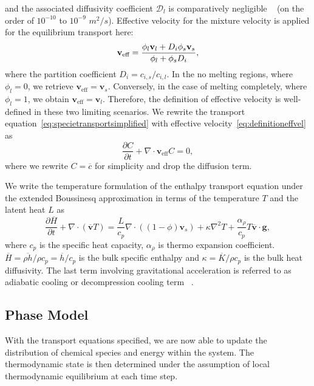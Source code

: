 and the associated diffusivity coefficient $\mathcal{D}_l$
is comparatively negligible ~\cite{GeochemicalConsequence} (on the order of $10^{-10}$ to $10^{-9}$ $m^2/s$). 
Effective velocity for the mixture velocity is applied for the equilibrium transport here:
\begin{equation}\label{eq:definitioneffvel}
\bold{v}_{\text{eff}} = \frac{\phi_l \bold{v}_l + D_i\phi_s \bold{v}_s}{\phi_l + \phi_s D_i},
\end{equation}
where the partition coefficient $D_i = c_{i,s}/c_{i,l}$.
In the no melting regions, where $\phi_l = 0$, we retrieve 
$\mathbf{v}_{\text{eff}} = \mathbf{v}_s$.
Conversely, in the case of melting completely, where $\phi_l = 1$, we obtain
$\mathbf{v}_{\text{eff}} = \mathbf{v}_l$.
Therefore, the definition of effective velocity is well-defined in these two limiting scenarios. 
We rewrite the transport equation~\eqref{eq:specietransportsimplified} with 
effective velocity~\eqref{eq:definitioneffvel} as
\begin{equation}\label{eq:effectivetransportspecie}
		  \frac{\partial C}{\partial t} + 
		  \nabla \cdot \mathbf{v}_{\text{eff}} C 
		  = 0,
\end{equation}
where we rewrite $C = \overline{c}$ for simplicity and drop the diffusion term.

We write the temperature formulation of the enthalpy transport equation under the 
extended Boussinesq approximation in terms of the temperature $T$ and the latent heat $L$ as
\begin{equation}\label{eq:normalizedenthalpy}
		  \frac{\partial \overline{H}}{\partial t} + \nabla \cdot (\overline{\mathbf{v}} T) = 
		  \frac{L}{c_p} \nabla \cdot ((1-\phi) \mathbf{v}_s) + \kappa \nabla^2 T + 
		  \frac{\alpha_\rho}{c_p} T \overline{\mathbf{v}} \cdot \mathbf{g},
\end{equation}
where $c_p$ is the specific heat capacity, $\alpha_\rho$ is thermo expansion coefficient.
$\overline{H} = \overline{\rho h}/\rho c_p = \overline{h}/c_p$ is the bulk specific enthalpy and $\kappa = 
\overline{K}/\rho c_p$ is the bulk heat diffusivity.
The last term involving gravitational acceleration is referred 
to as adiabatic cooling or decompression cooling term 
~\cite{ExtensionofLithosphere}.

\subsection{Phase Model}
With the transport equations specified, we are now able to update the distribution of 
chemical species and energy within the system.
The thermodynamic state is then determined under the assumption of local 
thermodynamic equilibrium at each time step.

